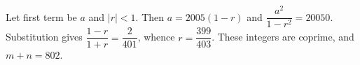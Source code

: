 Let first term be $a$ and $|r|<1$. Then $a=2005(1-r)$ and $\dfrac{a^2}{1-r^2}=20050$. Substitution gives $\dfrac{1-r}{1+r}=\dfrac{2}{401}$, whence $r=\dfrac{399}{403}$. These integers are coprime, and $\boxed{m+n=802}$.
